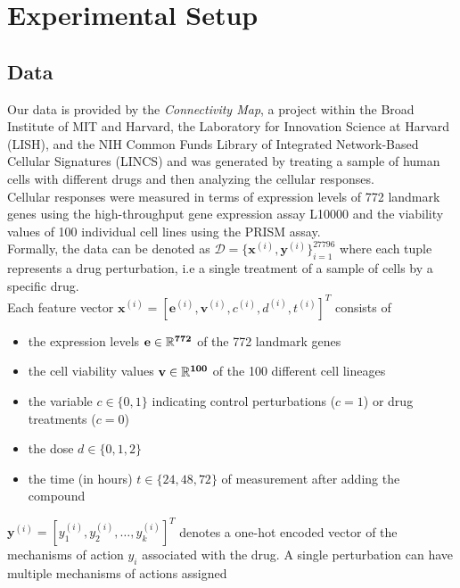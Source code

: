 \documentclass[bsc,frontabs,twoside,singlespacing,parskip,deptreport]{infthesis}     %
\let\Oldsection\section
\renewcommand{\section}{\FloatBarrier\Oldsection}
\begin{document}


\chapter{Experimental Setup}\label{methodology}

\section{Data}
Our data is provided by the \textit{Connectivity Map}, a project within the Broad Institute of MIT and Harvard, the Laboratory for Innovation Science at Harvard (LISH), and the NIH Common Funds Library of Integrated Network-Based Cellular Signatures (LINCS) and was generated by treating a sample of human cells with different drugs and then analyzing the cellular responses. \\ Cellular responses were measured in terms of expression levels of 772 landmark genes using the high-throughput gene expression assay L10000 and the viability values of 100 individual cell lines using the PRISM assay.\\
Formally, the data can be denoted as \(\mathscr{D}=\{\mathbf{x}^{(i)},\mathbf{y}^{(i)}\}_{i=1}^{27796}\) where each tuple represents a drug perturbation, i.e a single treatment of a sample of cells by a specific drug.
\\ Each feature vector \(\mathbf{x}^{(i)}=[\mathbf{e}^{(i)},\mathbf{v}^{(i)}, c^{(i)},d^{(i)},t^{(i)}]^{T}\) consists of 
\begin{itemize}
    \item the expression levels \(\bf{e} \in \mathbb{R}^{772}\) of the 772 landmark genes
    \item the cell viability values \(\bf{v} \in \mathbb{R}^{100}\) of the 100 different cell lineages
    \item the variable \(c \in \{0,1\}\) indicating control perturbations (\(c=1\)) or drug treatments (\(c=0\))
    \item the dose \(d \in \{0,1,2\}\)
    \item the time (in hours) \(t \in \{24,48,72\}\) of measurement after adding the compound
    
\end{itemize}

\(\mathbf{y}^{(i)}=[y_{1}^{(i)},y_{2}^{(i)},\ldots, y_{k}^{(i)}]^{T}\) denotes a one-hot encoded vector of the mechanisms of action \(y_{i}\) associated with the drug. A single perturbation can have multiple mechanisms of actions assigned
\end{document}
